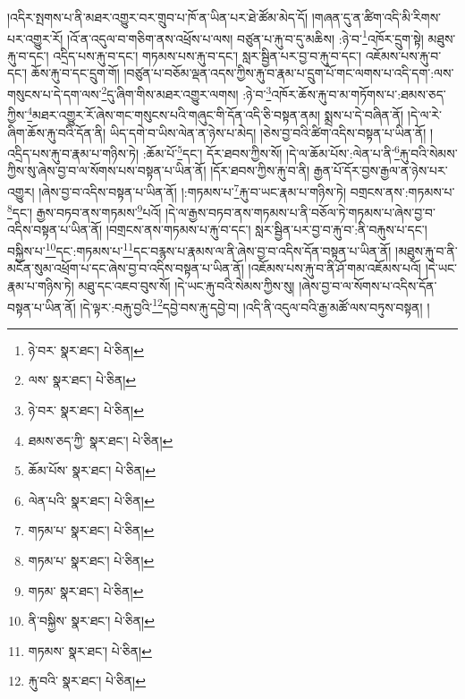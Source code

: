 །འདིར་སྤགས་པ་ནི་མཐར་འགྱུར་བར་གྲུབ་པ་ཁོ་ན་ཡིན་པར་ཐེ་ཚོམ་མེད་དོ། །གཞན་དུ་ན་ཚིག་འདི་མི་རིགས་པར་འགྱུར་རོ། །འོ་ན་འདུལ་བ་གཅིག་ནས་འཕྲོས་པ་ལས། བཙུན་པ་རྐུ་བ་དུ་མཆིས། :ཉེ་བ་\footnote{ཉེ་བར་  སྣར་ཐང་།  པེ་ཅིན། }འཁོར་དྲུག་སྟེ། མཐུས་རྐུ་བ་དང་། འདྲིད་པས་རྐུ་བ་དང་། གཏམས་པས་རྐུ་བ་དང་། སླར་སྦྱིན་པར་བྱ་བ་རྐུ་བ་དང་། འཇོམས་པས་རྐུ་བ་དང་། ཆོས་རྐུ་བ་དང་དྲུག་གོ། །བཙུན་པ་བཅོམ་ལྡན་འདས་ཀྱིས་རྐུ་བ་རྣམ་པ་དྲུག་པོ་གང་ལགས་པ་འདི་དག་:ལས་གསུངས་པ་དེ་དག་ལས་\footnote{ལས་  སྣར་ཐང་།  པེ་ཅིན། }དུ་ཞིག་གིས་མཐར་འགྱུར་ལགས། :ཉེ་བ་\footnote{ཉེ་བར་  སྣར་ཐང་།  པེ་ཅིན། }འཁོར་ཆོས་རྐུ་བ་མ་གཏོགས་པ་:ཐམས་ཅད་ཀྱིས་\footnote{ཐམས་ཅད་ཀྱི་  སྣར་ཐང་།  པེ་ཅིན། }མཐར་འགྱུར་རོ་ཞེས་གང་གསུངས་པའི་གཞུང་གི་དོན་འདི་ཅི་བསྟན་ནམ། སྨྲས་པ་དེ་བཞིན་ནོ། །དེ་ལ་རེ་ཞིག་ཆོས་རྐུ་བའི་དོན་ནི། ཡིད་དགེ་བ་ཡིས་ལེན་ན་ཉེས་པ་མེད། །ཅེས་བྱ་བའི་ཚིག་འདིས་བསྟན་པ་ཡིན་ནོ། །འདྲིད་པས་རྐུ་བ་རྣམ་པ་གཉིས་ཏེ། :ཆོམ་པོ་\footnote{ཆོམ་པོས་  སྣར་ཐང་།  པེ་ཅིན། }དང་། དོར་ཐབས་ཀྱིས་སོ། །དེ་ལ་ཆོམ་པོས་:ལེན་པ་ནི་\footnote{ལེན་པའི་  སྣར་ཐང་།  པེ་ཅིན། }རྐུ་བའི་སེམས་ཀྱིས་སུ་ཞེས་བྱ་བ་ལ་སོགས་པས་བསྟན་པ་ཡིན་ནོ། །དོར་ཐབས་ཀྱིས་རྐུ་བ་ནི། རྒྱན་པོ་དོར་བྱས་རྒྱལ་ན་ཉེས་པར་འགྱུར། །ཞེས་བྱ་བ་འདིས་བསྟན་པ་ཡིན་ནོ། །:གཏམས་པ་\footnote{གཏམ་པ་  སྣར་ཐང་།  པེ་ཅིན། }རྐུ་བ་ཡང་རྣམ་པ་གཉིས་ཏེ། བགྲངས་ནས་:གཏམས་པ་\footnote{གཏམ་པ་  སྣར་ཐང་།  པེ་ཅིན། }དང་། རྒྱས་བཏབ་ནས་གཏམས་\footnote{གཏམ་  སྣར་ཐང་།  པེ་ཅིན། }པའོ། །དེ་ལ་རྒྱས་བཏབ་ནས་གཏམས་པ་ནི་བཅོལ་ཏེ་གཏམས་པ་ཞེས་བྱ་བ་འདིས་བསྟན་པ་ཡིན་ནོ། །བགྲངས་ནས་གཏམས་པ་རྐུ་བ་དང་། སླར་སྦྱིན་པར་བྱ་བ་རྐུ་བ་:ནི་བརྐུས་པ་དང་། བསྐྱིས་པ་\footnote{ནི་བསྐྱིས་  སྣར་ཐང་།  པེ་ཅིན། }དང་:གཏམས་པ་\footnote{གཏམས་  སྣར་ཐང་།  པེ་ཅིན། }དང་བརྙས་པ་རྣམས་ལ་ནི་ཞེས་བྱ་བ་འདིས་དོན་བསྟན་པ་ཡིན་ནོ། །མཐུས་རྐུ་བ་ནི་མངོན་སུམ་འཕྲོག་པ་དང་ཞེས་བྱ་བ་འདིས་བསྟན་པ་ཡིན་ནོ། །འཇོམས་པས་རྐུ་བ་ནི་ཤོ་གམ་འཇོམས་པའོ། །དེ་ཡང་རྣམ་པ་གཉིས་ཏེ། མཐུ་དང་འཇབ་བུས་སོ། །དེ་ཡང་རྐུ་བའི་སེམས་ཀྱིས་སུ། །ཞེས་བྱ་བ་ལ་སོགས་པ་འདིས་དོན་བསྟན་པ་ཡིན་ནོ། །དེ་ལྟར་:བརྐུ་བྱའི་\footnote{རྐུ་བའི་  སྣར་ཐང་།  པེ་ཅིན། }དབྱེ་བས་རྐུ་དབྱེ་བ། །འདི་ནི་འདུལ་བའི་རྒྱ་མཚོ་ལས་བཏུས་བསྟན། །
